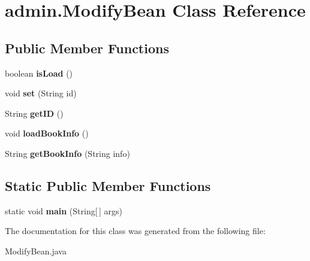 \hypertarget{classadmin_1_1_modify_bean}{}\section{admin.\+Modify\+Bean Class Reference}
\label{classadmin_1_1_modify_bean}
\subsection*{Public Member Functions}
\begin{DoxyCompactItemize}
\item 
boolean {\bfseries is\+Load} ()\hypertarget{classadmin_1_1_modify_bean_a504e0ce1bcef8665104cd2c7f2a92a90}{}\label{classadmin_1_1_modify_bean_a504e0ce1bcef8665104cd2c7f2a92a90}

\item 
void {\bfseries set} (String id)\hypertarget{classadmin_1_1_modify_bean_a2452b17b38f39a9cfd782c30979024b5}{}\label{classadmin_1_1_modify_bean_a2452b17b38f39a9cfd782c30979024b5}

\item 
String {\bfseries get\+ID} ()\hypertarget{classadmin_1_1_modify_bean_a1edb15b8795b61fb1c3869473dc4fd65}{}\label{classadmin_1_1_modify_bean_a1edb15b8795b61fb1c3869473dc4fd65}

\item 
void {\bfseries load\+Book\+Info} ()\hypertarget{classadmin_1_1_modify_bean_a0854744826c47dc16b1d49d0f9b02e59}{}\label{classadmin_1_1_modify_bean_a0854744826c47dc16b1d49d0f9b02e59}

\item 
String {\bfseries get\+Book\+Info} (String info)\hypertarget{classadmin_1_1_modify_bean_aef1625745802811d0d717bddcf79a858}{}\label{classadmin_1_1_modify_bean_aef1625745802811d0d717bddcf79a858}

\end{DoxyCompactItemize}
\subsection*{Static Public Member Functions}
\begin{DoxyCompactItemize}
\item 
static void {\bfseries main} (String\mbox{[}$\,$\mbox{]} args)\hypertarget{classadmin_1_1_modify_bean_a9966a4574bc56a7b121596ec3a8e1400}{}\label{classadmin_1_1_modify_bean_a9966a4574bc56a7b121596ec3a8e1400}

\end{DoxyCompactItemize}


The documentation for this class was generated from the following file\+:\begin{DoxyCompactItemize}
\item 
Modify\+Bean.\+java\end{DoxyCompactItemize}
